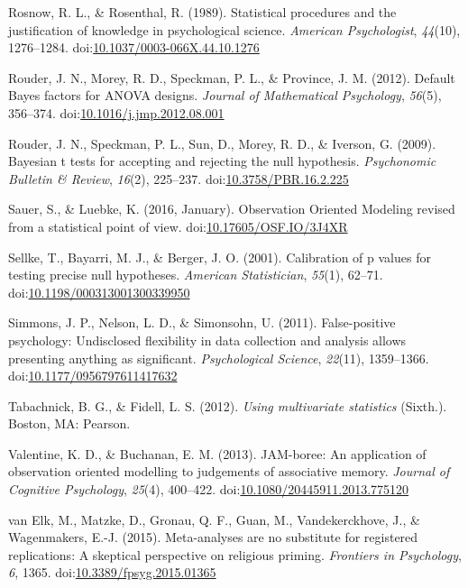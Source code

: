 \documentclass[english,mask,man]{apa6}
\theoremstyle{definition}
\theoremstyle{definition}
\theoremstyle{definition}
\theoremstyle{remark}
\begin{document}
\hypertarget{ref-Rosnow1989}{}
Rosnow, R. L., \& Rosenthal, R. (1989). Statistical procedures and the
justification of knowledge in psychological science. \emph{American
Psychologist}, \emph{44}(10), 1276--1284.
doi:\href{https://doi.org/10.1037/0003-066X.44.10.1276}{10.1037/0003-066X.44.10.1276}

\hypertarget{ref-Rouder2012}{}
Rouder, J. N., Morey, R. D., Speckman, P. L., \& Province, J. M. (2012).
Default Bayes factors for ANOVA designs. \emph{Journal of Mathematical
Psychology}, \emph{56}(5), 356--374.
doi:\href{https://doi.org/10.1016/j.jmp.2012.08.001}{10.1016/j.jmp.2012.08.001}

\hypertarget{ref-Rouder2009}{}
Rouder, J. N., Speckman, P. L., Sun, D., Morey, R. D., \& Iverson, G.
(2009). Bayesian t tests for accepting and rejecting the null
hypothesis. \emph{Psychonomic Bulletin \& Review}, \emph{16}(2),
225--237.
doi:\href{https://doi.org/10.3758/PBR.16.2.225}{10.3758/PBR.16.2.225}

\hypertarget{ref-Sauer2016}{}
Sauer, S., \& Luebke, K. (2016, January). Observation Oriented Modeling
revised from a statistical point of view.
doi:\href{https://doi.org/10.17605/OSF.IO/3J4XR}{10.17605/OSF.IO/3J4XR}

\hypertarget{ref-Sellke2001}{}
Sellke, T., Bayarri, M. J., \& Berger, J. O. (2001). Calibration of p
values for testing precise null hypotheses. \emph{American
Statistician}, \emph{55}(1), 62--71.
doi:\href{https://doi.org/10.1198/000313001300339950}{10.1198/000313001300339950}

\hypertarget{ref-Simmons2011}{}
Simmons, J. P., Nelson, L. D., \& Simonsohn, U. (2011). False-positive
psychology: Undisclosed flexibility in data collection and analysis
allows presenting anything as significant. \emph{Psychological Science},
\emph{22}(11), 1359--1366.
doi:\href{https://doi.org/10.1177/0956797611417632}{10.1177/0956797611417632}

\hypertarget{ref-Tabachnick2012}{}
Tabachnick, B. G., \& Fidell, L. S. (2012). \emph{Using multivariate
statistics} (Sixth.). Boston, MA: Pearson.

\hypertarget{ref-Valentine2013}{}
Valentine, K. D., \& Buchanan, E. M. (2013). JAM-boree: An application
of observation oriented modelling to judgements of associative memory.
\emph{Journal of Cognitive Psychology}, \emph{25}(4), 400--422.
doi:\href{https://doi.org/10.1080/20445911.2013.775120}{10.1080/20445911.2013.775120}

\hypertarget{ref-VanElk2015}{}
van Elk, M., Matzke, D., Gronau, Q. F., Guan, M., Vandekerckhove, J., \&
Wagenmakers, E.-J. (2015). Meta-analyses are no substitute for
registered replications: A skeptical perspective on religious priming.
\emph{Frontiers in Psychology}, \emph{6}, 1365.
doi:\href{https://doi.org/10.3389/fpsyg.2015.01365}{10.3389/fpsyg.2015.01365}
\end{document}
